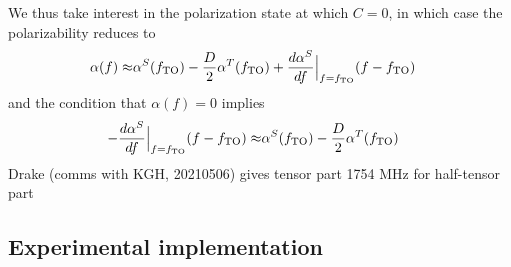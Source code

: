 	We thus take interest in the polarization state at which $C=0$, in which case the polarizability reduces to 
	\begin{align}
		 \alpha(f)  \approx & \alpha^S(f_\mathrm{TO}) -\frac{D}{2}\alpha^T(f_\mathrm{TO}) +  \frac{d\alpha^S}{df}\Bigr|_{f=f_\mathrm{TO}} (f-f_\mathrm{TO})
	\end{align}
	and the condition that $\alpha(f)=0$ implies
	\begin{align}
		 -\frac{d\alpha^S}{df}\Bigr|_{f=f_\mathrm{TO}} (f-f_\mathrm{TO})  \approx & \alpha^S(f_\mathrm{TO}) -\frac{D}{2}\alpha^T(f_\mathrm{TO}) 
	\end{align}
	Drake (comms with KGH, 20210506) gives tensor part 1754 MHz for half-tensor part





	









\subsection{Experimental implementation}
	
